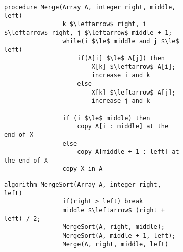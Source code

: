 \documentclass{subfiles}
\begin{document}
\begin{figure}[!h]
    \centering
    \begin{subfigure}[b]{0.65\textwidth}
        \begin{lstlisting}[language = algol]
            procedure Merge(Array A, integer right, middle, left)
                k $\leftarrow$ right, i $\leftarrow$ right, j $\leftarrow$ middle + 1;
                while(i $\le$ middle and j $\le$ left)
                    if(A[i] $\le$ A[j]) then
                        X[k] $\leftarrow$ A[i];
                        increase i and k
                    else 
                        X[k] $\leftarrow$ A[j];
                        increase j and k

                if (i $\le$ middle) then
                    copy A[i : middle] at the end of X
                else
                    copy A[middle + 1 : left] at the end of X
                copy X in A
        \end{lstlisting}
    \end{subfigure}
    \begin{subfigure}[b]{0.65\textwidth}
        \begin{lstlisting}[language = algol]
            algorithm MergeSort(Array A, integer right, left)
                if(right > left) break
                middle $\leftarrow$ (right + left) / 2;
                MergeSort(A, right, middle);
                MergeSort(A, middle + 1, left);
                Merge(A, right, middle, left)
        \end{lstlisting}
    \end{subfigure}
\end{figure}
\end{document}
